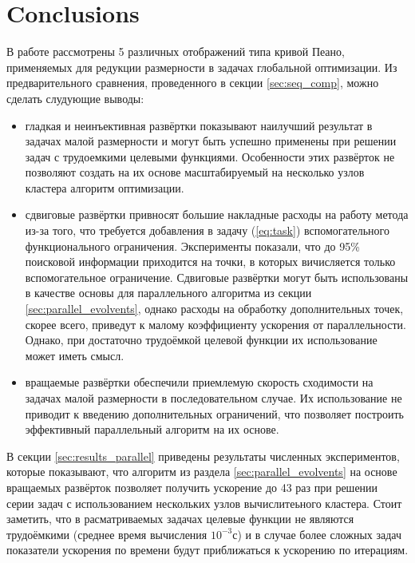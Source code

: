 \documentclass[runningheads]{llncs}
\begin{document}
\section{Conclusions}
В работе рассмотрены 5 различных отображений типа кривой Пеано, применяемых для редукции размерности в задачах глобальной оптимизации.
Из предварительного сравнения, проведенного в секции \ref{sec:seq_comp}, можно сделать слудующие выводы:
\begin{itemize}
  \item гладкая и неинъективная развёртки показывают наилучший результат в задачах малой размерности и могут быть успешно применены при решении задач с трудоемкими целевыми функциями. Особенности этих развёрток не позволяют создать на их основе масштабируемый на несколько узлов кластера алгоритм оптимизации.
  \item сдвиговые развёртки привносят большие накладные расходы на работу метода из-за того, что требуется добавления в задачу (\ref{eq:task}) вспомогательного функционального ограничения. Эксперименты показали, что до 95\% поисковой информации приходится на точки, в которых вичисляется только вспомогательное ограничение. Сдвиговые развёртки могут быть использованы в качестве основы для параллельного алгоритма из секции \ref{sec:parallel_evolvents}, однако расходы на обработку дополнительных точек, скорее всего, приведут к малому коэффициенту ускорения от параллельности. Однако, при достаточно трудоёмкой целевой функции их использование может иметь смысл.
  \item вращаемые развёртки обеспечили приемлемую скорость сходимости на задачах малой размерности в последовательном случае. Их использование не приводит к введению дополнительных ограничений, что позволяет построить эффективный параллельный алгоритм на их основе.
\end{itemize}

В секции \ref{sec:results_parallel} приведены результаты численных экспериментов, которые показывают, что алгоритм из раздела \ref{sec:parallel_evolvents} на основе вращаемых развёрток позволяет получить ускорение до 43 раз при решении серии задач с использованием нескольких узлов вычислитеьного кластера. Стоит заметить, что в расматриваемых задачах целевые функции не являются трудоёмкими (среднее время вычисления $10^{-3}$с) и в случае более сложных задач показатели ускорения по времени будут приближаться к ускорению по итерациям.
\end{document}
